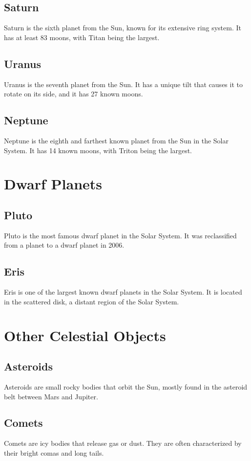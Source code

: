 \documentclass{article}
\begin{document}
\subsection{Saturn}
Saturn is the sixth planet from the Sun, known for its extensive ring system. It has at least 83 moons, with Titan being the largest.

\subsection{Uranus}
Uranus is the seventh planet from the Sun. It has a unique tilt that causes it to rotate on its side, and it has 27 known moons.

\subsection{Neptune}
Neptune is the eighth and farthest known planet from the Sun in the Solar System. It has 14 known moons, with Triton being the largest.

\section{Dwarf Planets}
\subsection{Pluto}
Pluto is the most famous dwarf planet in the Solar System. It was reclassified from a planet to a dwarf planet in 2006.

\subsection{Eris}
Eris is one of the largest known dwarf planets in the Solar System. It is located in the scattered disk, a distant region of the Solar System.

\section{Other Celestial Objects}
\subsection{Asteroids}
Asteroids are small rocky bodies that orbit the Sun, mostly found in the asteroid belt between Mars and Jupiter.

\subsection{Comets}
Comets are icy bodies that release gas or dust. They are often characterized by their bright comas and long tails.
\end{document}
